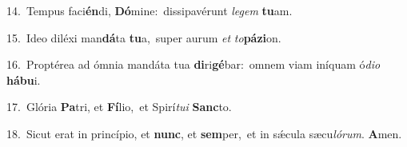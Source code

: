 {\numbfont\textcolor{\numbcolor}{14.}}~Tempus faci\-\textbf{én}\-di, \textbf{Dó}\-mine:~\star dissipavérunt \textit{le}\-\textit{gem} \textbf{tu}\-am.\par
{\numbfont\textcolor{\numbcolor}{15.}}~Ideo diléxi man\-\textbf{dá}\-ta \textbf{tu}\-a,~\star super aurum \textit{et} \textit{to}\-\textbf{pá}\textbf{zi}on.\par
{\numbfont\textcolor{\numbcolor}{16.}}~Proptérea ad ómnia mandáta tua \textbf{di}\-ri\-\textbf{gé}\-bar:~\star omnem viam iníquam ó\-\textit{di}\-\textit{o} \textbf{há}\-\textbf{bu}i.\par
{\numbfont\textcolor{\numbcolor}{17.}}~Glória \textbf{Pa}\-tri, et \textbf{Fí}\-lio,~\star et Spirí\-\textit{tu}\-\textit{i} \textbf{Sanc}\-to.\par
{\numbfont\textcolor{\numbcolor}{18.}}~Sicut erat in princípio, et \textbf{nunc}\-, et \textbf{sem}\-per,~\star et in sǽcula sæcu\-\textit{ló}\-\textit{rum}. \textbf{A}\-men.\par

